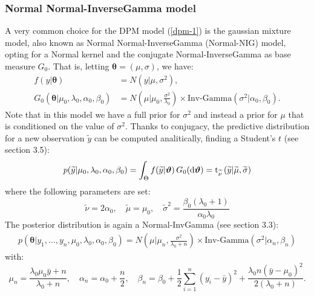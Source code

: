 \subsubsection{Normal Normal-InverseGamma model} \label{nnig}
A very common choice for the DPM model (\ref{dpm-1}) is the gaussian mixture model, also known as Normal Normal-InverseGamma (Normal-NIG) model, opting for a Normal kernel and the conjugate Normal-InverseGamma as base measure $G_0$. That is, letting $\boldsymbol\theta=(\mu,\sigma)$, we have:
\begin{equation}
	\begin{aligned}
		f(y|\boldsymbol\theta)&=N(y| \mu ,\sigma^2),  \\
		G_0(\boldsymbol\theta|\mu_0,\lambda_0, \alpha_0, 	\beta_0)
		&=N\left(\mu | \mu_0 ,\frac{\sigma^2} {\lambda_0}\right) \times \text{Inv-Gamma}(\sigma^2|\alpha_0, \beta_0 ).
	\end{aligned}
\end{equation}
Note that in this model we have a full prior for $\sigma^2$ and instead a prior for $\mu$ that is conditioned on the value of $\sigma^2$.
Thanks to conjugacy, the predictive distribution for a new observation $\widetilde{y}$ can be computed analitically, finding a Student's $t$ (see \cite{integral} section 3.5):
\begin{align*}
	p(\widetilde{y}|\mu_0,\lambda_0, \alpha_0, \beta_0) =
	\int_\Theta f(\widetilde{y}|\boldsymbol{\vartheta}) \, G_0(\mathrm d\boldsymbol{\vartheta}) =
	\text{t}_{\widetilde \nu}\left(\widetilde{y}|\widetilde{\mu},\widetilde{\sigma}\right)
\end{align*}
where the following parameters are set:
$$
	\widetilde{\nu}=2 \alpha_0, \quad
	\widetilde{\mu}=\mu_0, \quad
	\widetilde{\sigma}^2= \frac{\beta_0(\lambda_0+1)}{\alpha_0 \lambda_0}
$$
The posterior distribution is again a Normal-InvGamma (see \cite{integral} section 3.3):
\begin{align*}
	p(\boldsymbol\theta|y_1,\dots,y_n,\mu_0,\lambda_0, \alpha_0, \beta_0)=N\left(\mu | \mu_n ,\frac{\sigma^2} {\lambda_0 + n}\right) \times \text{Inv-Gamma}(\sigma^2|\alpha_n, \beta_n )
\end{align*}
with:
$$
\mu_n=\frac{\lambda_0 \mu_0 \bar{y} + n}{\lambda_0 + n}, \quad \alpha_n= \alpha_0 + \frac{n}{2}, \quad \beta_n= \beta_0 + \frac{1}{2}\sum_{i=1}^{n} (y_i-\bar{y})^2 + \frac{\lambda_0 n(\bar{y}-\mu_0)^2}{2(\lambda_0 + n)}.
$$

